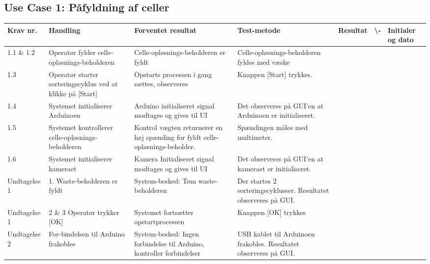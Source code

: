 \subsection{Use Case 1: Påfyldning af celler}
\begin{center}
		\begin{longtable}{ | m{1.785cm} | m{1.785cm}| m{1.785cm}| m{1.785cm}| m{1.785cm}| m{1.785cm}|m{1.785cm}| } 
			\hline
			\textbf{Krav nr.} &\textbf{ Handling} & \textbf{Forventet resultat} & \textbf{Test-metode} &\textbf{Resultat} & \textbf{ \checkmark \textbackslash -} & \textbf{Initialer og dato} \\ 
			
			\hline
			1.1 \& 1.2 &  Operatør fylder celle-opløsnings-beholderen & Celle-opløsnings-beholderen er fyldt  & Celle-opløsnings-beholderen fyldes med væske  &  & & \\
			

			\hline
			
			1.3 &  Operatør starter sorteringscyklus ved at klikke på [Start]  & Opstarts processen i gang sættes, observeres & Knappen [Start] trykkes.  &  & & \\
			\hline
			
			1.4 &  Systemet initialiserer Arduinoen  & Arduino initialiseret signal modtages og gives til UI & Det observeres på GUI’en at Arduinoen er initialiseret.  &  & & \\
			\hline
			
			1.5 &  Systemet kontrollerer celle-opløsnings-beholderen & Kontrol vægten returnerer en høj spænding for fyldt celle-opløsnings-beholder. & Spændingen måles med multimeter.  &  & & \\
			\hline
			\fxnote{ Tabeloverskrifter skal fortsætte på næste side}
			1.6  &  Systemet initialiserer kameraet & Kamera Initialiseret signal modtages og gives til UI & Det observeres på GUI’en at kameraet er initialiseret.  &  & & \\
			\hline
			
			Undtagelse 1 & 1. Waste-beholderen er fyldt & System-besked: Tøm waste-beholderen & Der startes 2 sorteringscyklusser. Resultatet observeres på GUI.  &  & & \\
			\hline
			
			Undtagelse 1 & 2 \& 3 Operatør trykker [OK] & Systemet fortsætter opstartprocessen & Knappen [OK] trykkes  &  & & \\
			\hline
	
			
			Undtagelse 2 & For-bindelsen til Arduino frakobles  & System-besked:  Ingen forbindelse til Arduino, kontroller forbindelser & USB kablet til Arduinoen frakobles. Resultatet observeres på GUI.  &  & & \\
			\hline


\end{longtable}
\end{center}
